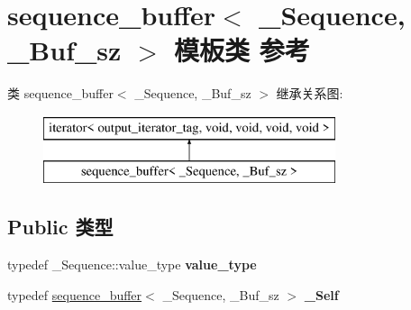 \hypertarget{classsequence__buffer}{}\section{sequence\+\_\+buffer$<$ \+\_\+\+Sequence, \+\_\+\+Buf\+\_\+sz $>$ 模板类 参考}
\label{classsequence__buffer}
类 sequence\+\_\+buffer$<$ \+\_\+\+Sequence, \+\_\+\+Buf\+\_\+sz $>$ 继承关系图\+:\begin{figure}[H]
\begin{center}
\leavevmode
\includegraphics[height=2.000000cm]{classsequence__buffer}
\end{center}
\end{figure}
\subsection*{Public 类型}
\begin{DoxyCompactItemize}
\item 
\mbox{\label{classsequence__buffer_ad93c6ffc8c65758fe575f621b160bd3a}} 
typedef \+\_\+\+Sequence\+::value\+\_\+type {\bfseries value\+\_\+type}
\item 
\mbox{\label{classsequence__buffer_a612cd9fc305e18c5879d7f5750166597}} 
typedef \hyperlink{classsequence__buffer}{sequence\+\_\+buffer}$<$ \+\_\+\+Sequence, \+\_\+\+Buf\+\_\+sz $>$ {\bfseries \+\_\+\+Self}
\end{DoxyCompactItemize}
